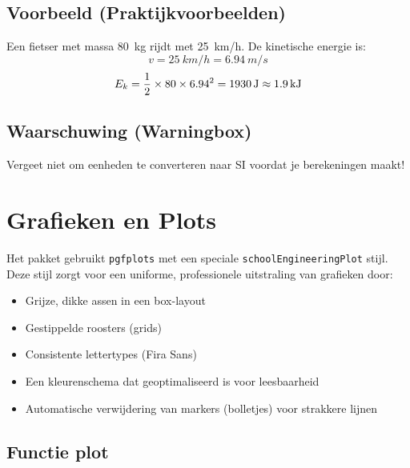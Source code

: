 \documentclass[a4paper,11pt]{article}
\begin{document}
\subsection{Voorbeeld (Praktijkvoorbeelden)}

\begin{voorbeeld}
Een fietser met massa \SI{80}{kg} rijdt met \SI{25}{km/h}. 
De kinetische energie is:
\[ v = \SI{25}{km/h} = \SI{6.94}{m/s} \]
\[ E_k = \frac{1}{2} \times 80 \times 6.94^2 = \SI{1930}{J} \approx \SI{1.9}{kJ} \]
\end{voorbeeld}

\subsection{Waarschuwing (Warningbox)}

\begin{waarschuwing}
 Vergeet niet om eenheden te converteren naar SI voordat je berekeningen maakt!
\end{waarschuwing}


\section{Grafieken en Plots}
\label{sec:plots}

Het pakket gebruikt \texttt{pgfplots} met een speciale \texttt{schoolEngineeringPlot} stijl.
Deze stijl zorgt voor een uniforme, professionele uitstraling van grafieken door:
\begin{itemize}
    \item Grijze, dikke assen in een box-layout
    \item Gestippelde roosters (grids)
    \item Consistente lettertypes (Fira Sans)
    \item Een kleurenschema dat geoptimaliseerd is voor leesbaarheid
    \item Automatische verwijdering van markers (bolletjes) voor strakkere lijnen
\end{itemize}

\subsection{Functie plot}
\end{document}
